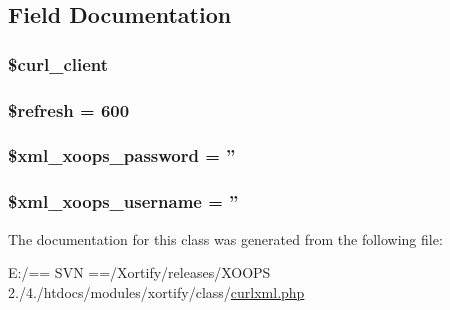 \subsection{Field Documentation}
\hypertarget{class_c_u_r_l_x_m_l_xortify_exchange_a402f2112991f3227835af80e9df33e38}{
\subsubsection[{\$curl\-\_\-client}]{\setlength{\rightskip}{0pt plus 5cm}\$curl\-\_\-client}}\label{class_c_u_r_l_x_m_l_xortify_exchange_a402f2112991f3227835af80e9df33e38}
\hypertarget{class_c_u_r_l_x_m_l_xortify_exchange_a8527f826b6959aaa92b0e51ee427ba1a}{
\subsubsection[{\$refresh}]{\setlength{\rightskip}{0pt plus 5cm}\$refresh = 600}}\label{class_c_u_r_l_x_m_l_xortify_exchange_a8527f826b6959aaa92b0e51ee427ba1a}
\hypertarget{class_c_u_r_l_x_m_l_xortify_exchange_a8ec2889165c837354fded1cedbd42157}{
\subsubsection[{\$xml\-\_\-xoops\-\_\-password}]{\setlength{\rightskip}{0pt plus 5cm}\$xml\-\_\-xoops\-\_\-password = ''}}\label{class_c_u_r_l_x_m_l_xortify_exchange_a8ec2889165c837354fded1cedbd42157}
\hypertarget{class_c_u_r_l_x_m_l_xortify_exchange_a725df0dd6b578e15522ed15945e5901c}{
\subsubsection[{\$xml\-\_\-xoops\-\_\-username}]{\setlength{\rightskip}{0pt plus 5cm}\$xml\-\_\-xoops\-\_\-username = ''}}\label{class_c_u_r_l_x_m_l_xortify_exchange_a725df0dd6b578e15522ed15945e5901c}


The documentation for this class was generated from the following file\-:\begin{DoxyCompactItemize}
\item 
E\-:/== S\-V\-N ==/\-Xortify/releases/\-X\-O\-O\-P\-S 2./4./htdocs/modules/xortify/class/\hyperlink{curlxml_8php}{curlxml.\-php}\end{DoxyCompactItemize}
